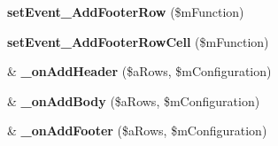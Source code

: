\begin{DoxyCompactItemize}
\item 
\hypertarget{classclsTable_a8bda5d382f90ca3461e4da1256dacccf}{
{\bfseries setEvent\_\-AddFooterRow} (\$mFunction)}
\label{classclsTable_a8bda5d382f90ca3461e4da1256dacccf}

\item 
\hypertarget{classclsTable_ab3d2f76fa2ccc992895a922bc1c31306}{
{\bfseries setEvent\_\-AddFooterRowCell} (\$mFunction)}
\label{classclsTable_ab3d2f76fa2ccc992895a922bc1c31306}

\item 
\hypertarget{classclsTable_a5b0f6c6ccd5632521180d7ecbb16329b}{
\& {\bfseries \_\-onAddHeader} (\$aRows, \$mConfiguration)}
\label{classclsTable_a5b0f6c6ccd5632521180d7ecbb16329b}

\item 
\hypertarget{classclsTable_ac84ed3552723424733900c3dbdcdb4f7}{
\& {\bfseries \_\-onAddBody} (\$aRows, \$mConfiguration)}
\label{classclsTable_ac84ed3552723424733900c3dbdcdb4f7}

\item 
\hypertarget{classclsTable_ae3dd32b1c52faae8d3af636de22c0381}{
\& {\bfseries \_\-onAddFooter} (\$aRows, \$mConfiguration)}
\label{classclsTable_ae3dd32b1c52faae8d3af636de22c0381}

\end{DoxyCompactItemize}
